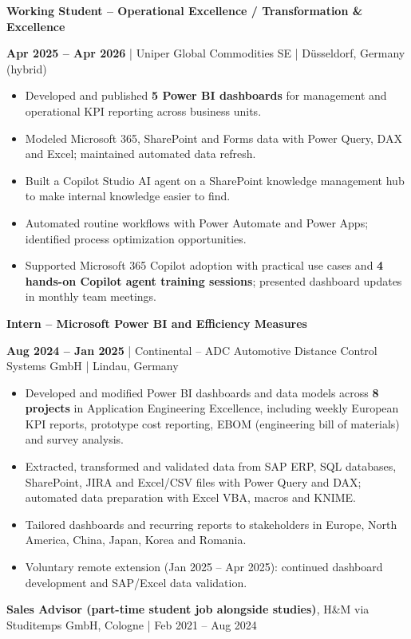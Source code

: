 \documentclass[10pt,a4paper]{article}
\newcommand{\role}[4]{%
  \vspace{0.22em}%
  {\bfseries #1}\par
  {\color{accent}\bfseries #2} | {\color{accent}#3} | {\color{muted}#4}\par}
\begin{document}
\role{Working Student – Operational Excellence / Transformation \& Excellence}{Apr 2025 – Apr 2026}
     {Uniper Global Commodities SE}{Düsseldorf, Germany (hybrid)}
\begin{itemize}
  \item Developed and published \textbf{5 Power BI dashboards} for management and operational KPI reporting across business units.
  \item Modeled Microsoft 365, SharePoint and Forms data with Power Query, DAX and Excel; maintained automated data refresh.
  \item Built a Copilot Studio AI agent on a SharePoint knowledge management hub to make internal knowledge easier to find.
  \item Automated routine workflows with Power Automate and Power Apps; identified process optimization opportunities.
  \item Supported Microsoft 365 Copilot adoption with practical use cases and \textbf{4 hands-on Copilot agent training sessions}; presented dashboard updates in monthly team meetings.
\end{itemize}

\role{Intern – Microsoft Power BI and Efficiency Measures}{Aug 2024 – Jan 2025}
     {Continental – ADC Automotive Distance Control Systems GmbH}{Lindau, Germany}
\begin{itemize}
  \item Developed and modified Power BI dashboards and data models across \textbf{8 projects} in Application Engineering Excellence, including weekly European KPI reports, prototype cost reporting, EBOM (engineering bill of materials) and survey analysis.
  \item Extracted, transformed and validated data from SAP ERP, SQL databases, SharePoint, JIRA and Excel/CSV files with Power Query and DAX; automated data preparation with Excel VBA, macros and KNIME.
  \item Tailored dashboards and recurring reports to stakeholders in Europe, North America, China, Japan, Korea and Romania.
  \item Voluntary remote extension (Jan 2025 – Apr 2025): continued dashboard development and SAP/Excel data validation.
\end{itemize}

\vspace{0.22em}%
{\bfseries Sales Advisor (part-time student job alongside studies)}, {\color{accent}H\&M via Studitemps GmbH}, Cologne | {\color{muted}Feb 2021 – Aug 2024}\par
\end{document}
